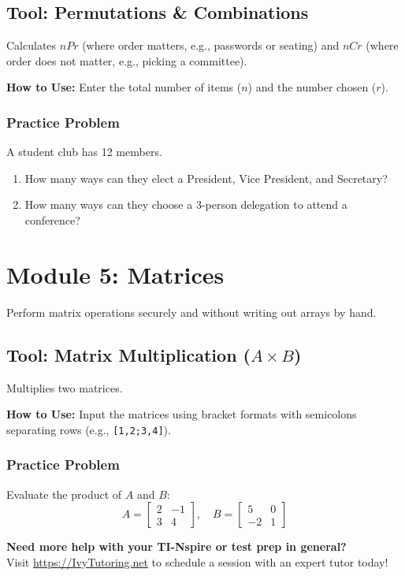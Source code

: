 \documentclass[11pt,a4paper]{article}
\begin{document}
\subsection{Tool: Permutations \& Combinations}
Calculates $nPr$ (where order matters, e.g., passwords or seating) and $nCr$ (where order does not matter, e.g., picking a committee).

\textbf{How to Use:} Enter the total number of items ($n$) and the number chosen ($r$). 

\subsubsection*{Practice Problem}
A student club has 12 members. 
\begin{enumerate}
    \item How many ways can they elect a President, Vice President, and Secretary? 
    \item How many ways can they choose a 3-person delegation to attend a conference?
\end{enumerate}

\newpage
\section{Module 5: Matrices}
Perform matrix operations securely and without writing out arrays by hand.

\subsection{Tool: Matrix Multiplication ($A\times B$)}
Multiplies two matrices.

\textbf{How to Use:} Input the matrices using bracket formats with semicolons separating rows (e.g., \texttt{[1,2;3,4]}). 

\subsubsection*{Practice Problem}
Evaluate the product of $A$ and $B$:
\[ A = \begin{bmatrix} 2 & -1 \\ 3 & 4 \end{bmatrix}, \quad B = \begin{bmatrix} 5 & 0 \\ -2 & 1 \end{bmatrix} \]

\vspace{2cm}
\begin{center}
\textbf{Need more help with your TI-Nspire or test prep in general?} \\
Visit \url{https://IvyTutoring.net} to schedule a session with an expert tutor today!
\end{center}
\end{document}
